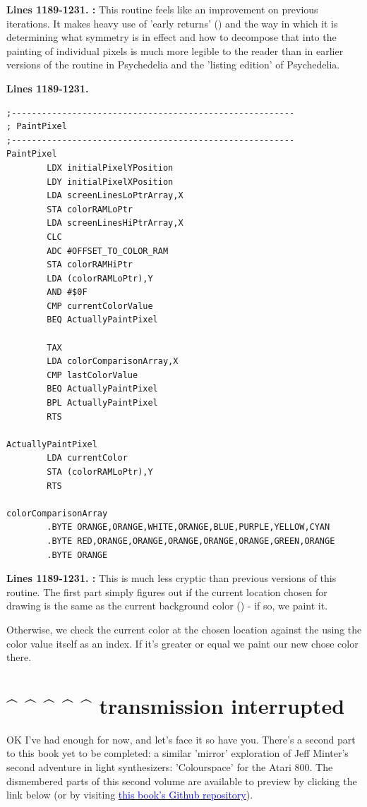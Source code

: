 \textbf{Lines 1189-1231. :} This routine feels like an improvement on
previous iterations. It makes heavy use of 'early returns' () and the way in which it is
determining what symmetry is in effect and how to decompose that into the painting of individual pixels is much more
legible to the reader than in earlier versions of the routine in Psychedelia and the 'listing edition' of Psychedelia.

\clearpage

\textbf{Lines 1189-1231. } 
\begin{lstlisting}[caption = All the pattern data structures in Psychedelia organized into a set of arrays.]
;--------------------------------------------------------
; PaintPixel
;--------------------------------------------------------
PaintPixel   
        LDX initialPixelYPosition
        LDY initialPixelXPosition
        LDA screenLinesLoPtrArray,X
        STA colorRAMLoPtr
        LDA screenLinesHiPtrArray,X
        CLC 
        ADC #OFFSET_TO_COLOR_RAM
        STA colorRAMHiPtr
        LDA (colorRAMLoPtr),Y
        AND #$0F
        CMP currentColorValue
        BEQ ActuallyPaintPixel

        TAX 
        LDA colorComparisonArray,X
        CMP lastColorValue
        BEQ ActuallyPaintPixel
        BPL ActuallyPaintPixel
        RTS 

ActuallyPaintPixel   
        LDA currentColor
        STA (colorRAMLoPtr),Y
        RTS 

colorComparisonArray   
        .BYTE ORANGE,ORANGE,WHITE,ORANGE,BLUE,PURPLE,YELLOW,CYAN
        .BYTE RED,ORANGE,ORANGE,ORANGE,ORANGE,ORANGE,GREEN,ORANGE
        .BYTE ORANGE

\end{lstlisting}
\clearpage

\textbf{Lines 1189-1231. :} This is much less cryptic than previous versions of this routine. The first part
simply figures out if the current location chosen for drawing is the same as the current background color () - if so,
we paint it.

Otherwise, we check the current color at the chosen location against the  using the color value itself as an index.
If it's greater or equal we paint our new chose color there.

\section*{\string^ \string^ \string^ \string^ \string^ transmission interrupted}
\vspace{-0.3cm}
OK I've had enough for now, and let's face it so have you. There's a second part to this book yet to be completed: a similar 'mirror' exploration
of Jeff Minter's second adventure in light synthesizers: 'Colourspace' for the Atari 800. The dismembered parts of this second volume are available
to preview by clicking the link below (or by visiting \href{https://github.com/mwenge/psypixels}{\textcolor{blue}{ this book's Github repository}}). 

